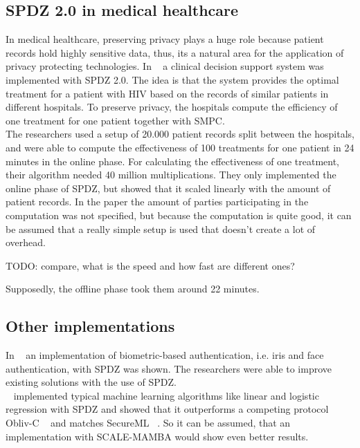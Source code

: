 \documentclass[english,runningheads,a4paper]{llncs}[2018/03/10]
\begin{document}
\subsection{SPDZ 2.0 in medical healthcare}
In medical healthcare, preserving privacy plays a huge role because patient records hold highly sensitive data, thus, its a natural area for the application of privacy protecting technologies. In ~\cite{PPCDSS} a clinical decision support system was implemented with SPDZ 2.0. The idea is that the system provides the optimal treatment for a patient with HIV based on the  records of similar patients in different hospitals. To preserve privacy, the hospitals compute the efficiency of one treatment for one patient together with SMPC.\\
The researchers used a setup of 20.000 patient records split between the hospitals, and were able to compute the effectiveness of 100 treatments for one patient in 24 minutes in the online phase. For calculating the effectiveness of one treatment, their algorithm needed 40 million multiplications. They only implemented the online phase of SPDZ, but showed that it scaled linearly with the amount of patient records. In the paper the amount of parties participating in the computation was not specified, but because the computation is quite good, it can be assumed that a really simple setup is used that doesn't create a lot of overhead.


TODO: compare, what is the speed and how fast are different ones? 


Supposedly, the offline phase took them around 22 minutes. 

\subsection{Other implementations}
In ~\cite{SEMBA} an implementation of biometric-based authentication, i.e. iris and face authentication, with SPDZ was shown. The researchers were able to improve existing solutions with the use of SPDZ.\\
~\cite{2019arXiv190100329C} implemented typical machine learning algorithms like linear and logistic regression with SPDZ and showed that it outperforms a competing protocol Obliv-C ~\cite{cryptoeprint:2015:1153} and matches SecureML ~\cite{SecureML}. So it can be assumed, that an implementation with SCALE-MAMBA would show even better results.\\
\end{document}

